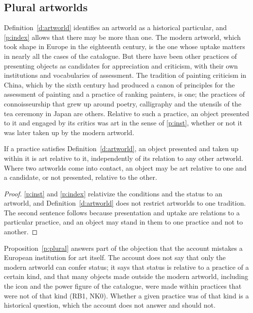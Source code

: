 \documentclass{situationist-preprint}
\begin{document}
\subsection{Plural artworlds}

Definition~\ref{d:artworld} identifies an artworld as a historical particular, and \ref{p:index} allows that there may be more than one. The modern artworld, which took shape in Europe in the eighteenth century, is the one whose uptake matters in nearly all the cases of the catalogue. But there have been other practices of presenting objects as candidates for appreciation and criticism, with their own institutions and vocabularies of assessment. The tradition of painting criticism in China, which by the sixth century had produced a canon of principles for the assessment of painting and a practice of ranking painters, is one; the practices of connoisseurship that grew up around poetry, calligraphy and the utensils of the tea ceremony in Japan are others. Relative to such a practice, an object presented to it and engaged by its critics was art in the sense of \ref{p:inst}, whether or not it was later taken up by the modern artworld.

\begin{proposition}\label{p:plural}
If a practice satisfies Definition~\ref{d:artworld}, an object presented and taken up within it is art relative to it, independently of its relation to any other artworld. Where two artworlds come into contact, an object may be art relative to one and a candidate, or not presented, relative to the other.
\end{proposition}

\begin{proof}
\ref{p:inst} and \ref{p:index} relativize the conditions and the status to an artworld, and Definition~\ref{d:artworld} does not restrict artworlds to one tradition. The second sentence follows because presentation and uptake are relations to a particular practice, and an object may stand in them to one practice and not to another.
\end{proof}

Proposition~\ref{p:plural} answers part of the objection that the account mistakes a European institution for art itself. The account does not say that only the modern artworld can confer status; it says that status is relative to a practice of a certain kind, and that many objects made outside the modern artworld, including the icon and the power figure of the catalogue, were made within practices that were not of that kind (RB1, NK0). Whether a given practice was of that kind is a historical question, which the account does not answer and should not.
\end{document}
